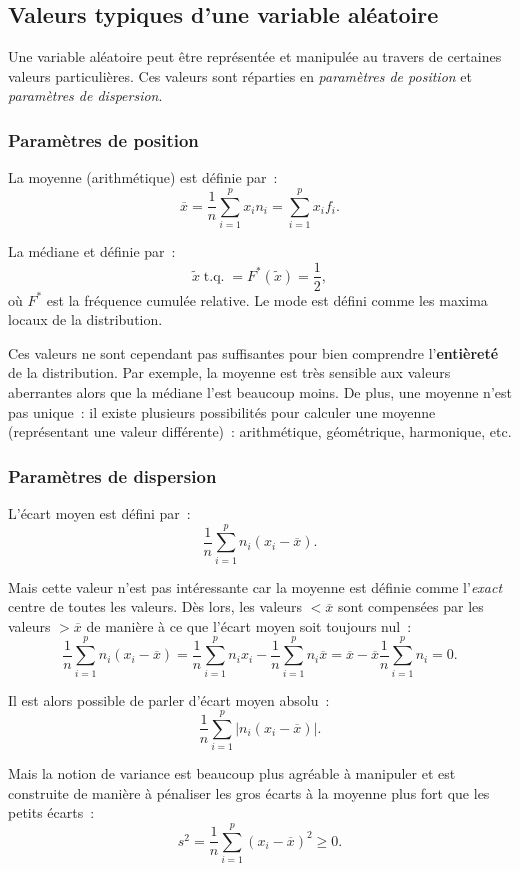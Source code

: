 \documentclass{article}
\DeclareMathOperator{\tq}{\text{ t.q. }}
\begin{document}
	\subsection{Valeurs typiques d'une variable aléatoire}
		Une variable aléatoire peut être représentée et manipulée au travers de certaines valeurs particulières. Ces valeurs sont réparties en \textit{paramètres de
		position} et \textit{paramètres de dispersion}.

		\subsubsection{Paramètres de position}
			La moyenne (arithmétique) est définie par~:
			\[\overline{x} = \frac 1n\sum_{i=1}^px_in_i = \sum_{i=1}^px_if_i.\]

			La médiane et définie par~:
			\[\widetilde{x} \tq = F^*(\widetilde{x}) = \frac 12,\]
			où $F^*$ est la fréquence cumulée relative. Le mode est défini comme les maxima locaux de la distribution.

			Ces valeurs ne sont cependant pas suffisantes pour bien comprendre l'\textbf{entièreté} de la distribution. Par exemple, la moyenne est très sensible aux
			valeurs aberrantes alors que la médiane l'est beaucoup moins. De plus, une moyenne n'est pas unique~: il existe plusieurs possibilités pour calculer une
			moyenne (représentant une valeur différente)~: arithmétique, géométrique, harmonique, etc.

		\subsubsection{Paramètres de dispersion}
			L'écart moyen est défini par~:
			\[\frac 1n\sum_{i=1}^pn_i(x_i-\overline{x}).\]

			Mais cette valeur n'est pas intéressante car la moyenne est définie comme l'\textit{exact} centre de toutes les valeurs. Dès lors, les valeurs
			$< \overline x$ sont compensées par les valeurs $> \overline x$ de manière à ce que l'écart moyen soit toujours nul~:
			\[\frac 1n\sum_{i=1}^pn_i(x_i-\overline x) = \frac 1n\sum_{i=1}^pn_ix_i - \frac 1n\sum_{i=1}^pn_i\overline x
				= \overline x - \overline{x}\frac 1n\sum_{i=1}^pn_i = 0.\]

			Il est alors possible de parler d'écart moyen absolu~:
			\[\frac 1n\sum_{i=1}^p|n_i(x_i-\overline x)|.\]

			Mais la notion de variance est beaucoup plus agréable à manipuler et est construite de manière à pénaliser les gros écarts à la moyenne plus fort que les
			petits écarts~:
			\[s^2 = \frac 1n\sum_{i=1}^p(x_i-\overline x)^2 \geq 0.\]
\end{document}
